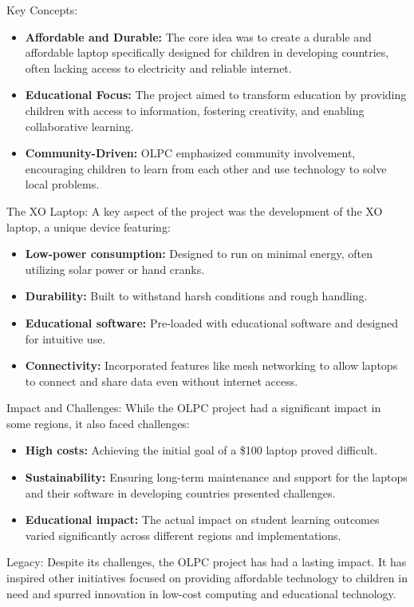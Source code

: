 \documentclass[a4paper,11pt]{article}
\begin{document}
{Key Concepts:}
\begin{itemize}
	\item \textbf{Affordable and Durable:}
	 The core idea was to create a durable and affordable laptop specifically designed for children in developing countries, often lacking access to electricity and reliable internet. 
	\item \textbf{Educational Focus:}
	 The project aimed to transform education by providing children with access to information, fostering creativity, and enabling collaborative learning.
	\item \textbf{Community-Driven:}
	 OLPC emphasized community involvement, encouraging children to learn from each other and use technology to solve local problems.
\end{itemize}

{The XO Laptop:}
A key aspect of the project was the development of the XO laptop, a unique device featuring:
\begin{itemize}
	\item \textbf{Low-power consumption:}
	 Designed to run on minimal energy, often utilizing solar power or hand cranks.
	\item \textbf{Durability:}
	 Built to withstand harsh conditions and rough handling.
	\item \textbf{Educational software:}
	 Pre-loaded with educational software and designed for intuitive use.
	\item \textbf{Connectivity:}
	 Incorporated features like mesh networking to allow laptops to connect and share data even without internet access.
\end{itemize}

{Impact and Challenges:}
While the OLPC project had a significant impact in some regions, it also faced challenges:
\begin{itemize}
	\item \textbf{High costs:}
	 Achieving the initial goal of a \$100 laptop proved difficult.
	\item \textbf{Sustainability:}
	 Ensuring long-term maintenance and support for the laptops and their software in developing countries presented challenges.
	\item \textbf{Educational impact:}
	 The actual impact on student learning outcomes varied significantly across different regions and implementations.
\end{itemize}

{Legacy:}
Despite its challenges, the OLPC project has had a lasting impact. It has inspired other initiatives focused on providing affordable technology to children in need and spurred innovation in low-cost computing and educational technology.
\end{document}
